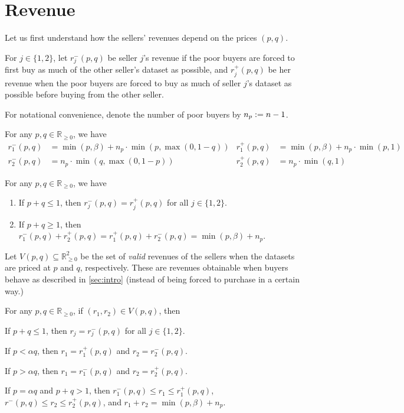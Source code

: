 \section{Revenue}
\label{sec:revenue}

Let us first understand how the sellers' revenues depend on the prices $(p, q)$.

For $j \in \{1, 2\}$, let $r^-_j(p, q)$ be seller $j$'s revenue if the poor buyers
are forced to first buy as much of the other seller's dataset as possible,
and $r^+_j(p, q)$ be her revenue when the poor buyers are forced to buy
as much of seller $j$'s dataset as possible before buying from the other seller.

For notational convenience, denote the number of poor buyers by $n_p := n-1$.

\begin{observation}
\label{thm:r-lo-hi}
For any $p, q \in \mathbb{R}_{\ge 0}$, we have
\begin{align*}
r^-_1(p, q) &= \min(p, \beta) + n_p \cdot \min(p, \max(0, 1-q))
& r^+_1(p, q) &= \min(p, \beta) + n_p \cdot \min(p, 1)
\\ r^-_2(p, q) &= n_p \cdot \min(q, \max(0, 1-p))
& r^+_2(p, q) &= n_p \cdot \min(q, 1)
\end{align*}
\end{observation}

\begin{observation}
For any $p, q \in \mathbb{R}_{\ge 0}$, we have
\begin{enumerate}
\item If $p + q \le 1$, then $r^-_j(p, q) = r^+_j(p, q)$ for all $j \in \{1, 2\}$.
\item If $p + q \ge 1$, then $r^-_1(p, q) + r^+_2(p, q) = r^+_1(p, q) + r^-_2(p, q) = \min(p, \beta) + n_p$.
\end{enumerate}
\end{observation}

Let $V(p, q) \subseteq \mathbb{R}_{\ge 0}^2$ be the set of \emph{valid} revenues of the sellers
when the datasets are priced at $p$ and $q$, respectively.
These are revenues obtainable when buyers behave as described in \cref{sec:intro}
(instead of being forced to purchase in a certain way.)

\begin{observation}
\label{thm:r}
For any $p, q \in \mathbb{R}_{\ge 0}$, if $(r_1, r_2) \in V(p, q)$, then
\begin{tightenum}
\item If $p + q \le 1$, then $r_j = r^-_j(p, q)$ for all $j \in \{1, 2\}$.
\item If $p < \alpha q$, then $r_1 = r^+_1(p, q)$ and $r_2 = r^-_2(p, q)$.
\item If $p > \alpha q$, then $r_1 = r^-_1(p, q)$ and $r_2 = r^+_2(p, q)$.
\item If $p = \alpha q$ and $p + q > 1$, then $r^-_1(p, q) \le r_1 \le r^+_1(p, q)$,
    $r^-(p, q) \le r_2 \le r^+_2(p, q)$, and $r_1 + r_2 = \min(p, \beta) + n_p$.
\end{tightenum}
\end{observation}

